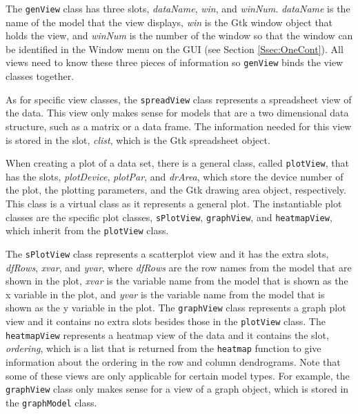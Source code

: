 \documentclass{article}[11pt]
\newcommand{\Rfunction}[1]{{\texttt{#1}}}
\newcommand{\Robject}[1]{{\texttt{#1}}}
\newcommand{\Rslot}[1]{\textsl{#1}}
\begin{document}
The \Robject{genView} class has three slots, \Rslot{dataName}, \Rslot{win},
and \Rslot{winNum}.  \Rslot{dataName} is the name of the model that the view
displays, \Rslot{win} is the Gtk window object that holds the view, and
\Rslot{winNum} is the number of the window so that the window can be
identified in the Window menu on the GUI (see Section \ref{Ssec:OneCont}).
All views need to know these three pieces of information so
\Robject{genView} binds the view classes together. 

As for specific view classes, the \Robject{spreadView} class represents a
spreadsheet view of the data.  This view only makes sense for models that
are a two dimensional data structure, such as a matrix or a data frame.  The
information needed for this view is stored in the slot, \Rslot{clist}, which
is the Gtk spreadsheet object.

When creating a plot of a data set, there is a general class, called
\Robject{plotView}, that has the slots, \Rslot{plotDevice}, \Rslot{plotPar},
and \Rslot{drArea}, which store the device number of the plot, the plotting
parameters, and the Gtk drawing area object, respectively.  This class is a
virtual class as it represents a general plot.  The instantiable plot classes
are the specific plot classes, \Robject{sPlotView}, \Robject{graphView}, and
\Robject{heatmapView}, which inherit from the \Robject{plotView} class.  

The \Robject{sPlotView} class represents a scatterplot view and it has the
extra slots, \Rslot{dfRows}, \Rslot{xvar}, and \Rslot{yvar}, where
\Rslot{dfRows} are the row names from the model that are shown in the plot,
\Rslot{xvar} is the variable name from the model that is shown as the x
variable in the plot, and \Rslot{yvar} is the variable name from the model
that is shown as the y variable in the plot.  The \Robject{graphView} class
represents a graph plot view and it contains no extra slots besides those in
the \Robject{plotView} class.  The \Robject{heatmapView} represents a heatmap
view of the data and it contains the slot, \Rslot{ordering}, which is a list
that is returned from the \Rfunction{heatmap} function to give information
about the ordering in the row and column dendrograms.  Note that some of these
views are only applicable for certain model types.  For example, the
\Robject{graphView} class only makes sense for a view of a graph object,
which is stored in the \Robject{graphModel} class. 
\end{document}
